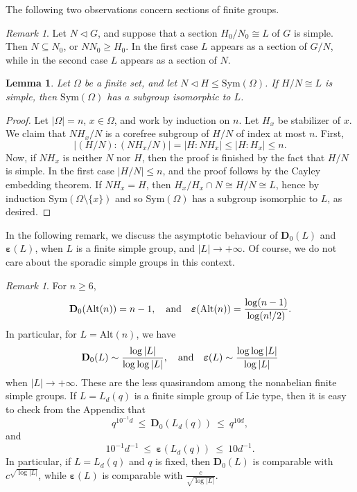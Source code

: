 \documentclass{daj}
\newtheorem{lemma}[theorem]{Lemma}
\theoremstyle{definition}
\theoremstyle{remark}
\newtheorem{remark}[theorem]{Remark}
\newcommand{\Alt}{\mathrm{Alt}}
\newcommand{\Sym}{\mathrm{Sym}}
\newcommand{\D}{\mathbf{D}}
\renewcommand{\a}{\boldsymbol{\varepsilon}}
\begin{document}
The following two observations concern sections of finite groups.

\begin{remark} \label{remSimSec}
		Let $N \lhd G$, and suppose that a section $H_0/N_0 \cong L$ of $G$ is simple.
		Then $N \subseteq N_0$, or  $NN_0 \geqslant H_0$.
		In the first case $L$ appears as a section of $G/N$, while in the second case $L$ appears as a section of $N$.
	\end{remark} 
	
	\begin{lemma} \label{lemSymSec}
	Let $\Omega$ be a finite set, and let $N \lhd H \leqslant \Sym(\Omega)$.
	If $H/N \cong L$ is simple, then $\Sym(\Omega)$ has a subgroup isomorphic to $L$.
\end{lemma}
\begin{proof}
Let $|\Omega|=n$, $x \in \Omega$, and work by induction on $n$.
Let $H_x$ be stabilizer of $x$.
We claim that $NH_x/N$ is a corefree subgroup of $H/N$ of index at most $n$.
First,
$$ |(H/N):(NH_x/N)| = |H:NH_x| \leq |H:H_x| \leq n . $$
Now, if $NH_x$ is neither $N$ nor $H$, then the proof is finished by the fact that $H/N$ is simple.
In the first case $|H/N| \leq n$, and the proof follows by the Cayley embedding theorem.
If $NH_x=H$, then $H_x/H_x \cap N \cong H/N \cong L$,
hence by induction $\Sym(\Omega \setminus \{x\})$ and so $\Sym(\Omega)$ has a subgroup isomorphic to $L$, as desired.
\end{proof}

In the following remark, we discuss the asymptotic behaviour of $\D_0(L)$ and $\a(L)$,
when $L$ is a finite simple group, and $|L| \rightarrow +\infty$.
Of course, we do not care about the sporadic simple groups in this context.

\begin{remark} \label{rem:LieCon} 
For $n \geq 6$,
$$ \D_0(\Alt(n)) = n-1, \quad \hbox{and} \quad \a(\Alt(n)) = \frac{\log (n-1)}{\log (n!/2)} . $$
In particular, for $L=\Alt(n)$, we have
$$ \D_0(L) \sim \frac{\log|L|}{\log\log|L|} , \quad \hbox{and} \quad \a(L) \sim \frac{\log\log|L|}{\log|L|} $$
when $|L| \rightarrow +\infty$.
These are the less quasirandom among the nonabelian finite simple groups.
If $L=L_d(q)$ is a finite simple group of Lie type, then it is easy to check from the Appendix that
	$$ q^{10^{-1}d} \> \leq \> \D_0(L_d(q)) \> \leq \> q^{10d} , $$
	and
	$$ 10^{-1} d^{-1} \> \leq \> \a(L_d(q)) \> \leq \> 10d^{-1} . $$
	In particular, if $L=L_d(q)$ and $q$ is fixed, then $\D_0(L)$ is comparable with $c^{\sqrt{\log|L|}}$,
	while $\a(L)$ is comparable with $\frac{c}{\sqrt{\log|L|}}$.
\end{remark} 
\end{document}
